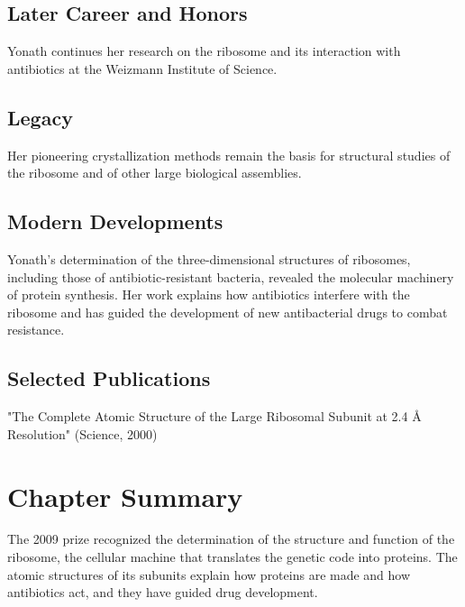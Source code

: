 \subsection*{Later Career and Honors}

Yonath continues her research on the ribosome and its interaction with antibiotics at the Weizmann Institute of Science.

\subsection*{Legacy}

Her pioneering crystallization methods remain the basis for structural studies of the ribosome and of other large biological assemblies.

\subsection*{Modern Developments}

Yonath's determination of the three-dimensional structures of ribosomes, including those of antibiotic-resistant bacteria, revealed the molecular machinery of protein synthesis. Her work explains how antibiotics interfere with the ribosome and has guided the development of new antibacterial drugs to combat resistance.

\subsection*{Selected Publications}

"The Complete Atomic Structure of the Large Ribosomal Subunit at 2.4 Å Resolution" (Science, 2000)

\clearpage

\section*{Chapter Summary}

The 2009 prize recognized the determination of the structure and function of the ribosome, the cellular machine that translates the genetic code into proteins. The atomic structures of its subunits explain how proteins are made and how antibiotics act, and they have guided drug development.
